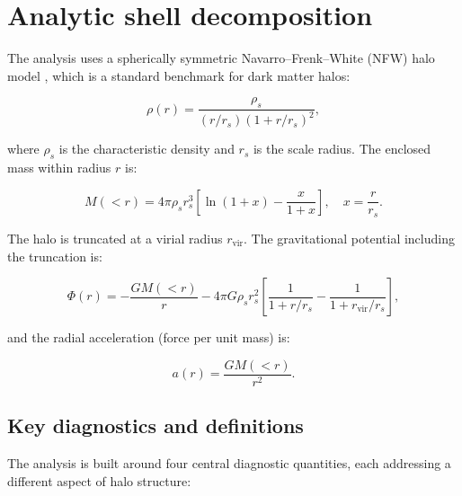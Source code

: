 \appendix
\chapter{Analytic shell decomposition}
\label{app:shells}

The analysis uses a spherically symmetric Navarro--Frenk--White (NFW) halo model \citep{navarro1996structure}, which is a standard benchmark for dark matter halos:

\begin{equation}
\rho(r) = \frac{\rho_s}{(r/r_s)(1 + r/r_s)^2},
\end{equation}

where $\rho_s$ is the characteristic density and $r_s$ is the scale radius. The enclosed mass within radius $r$ is:

\begin{equation}
M(<r) = 4\pi \rho_s r_s^3 \left[ \ln(1+x) - \frac{x}{1+x} \right], \quad x = \frac{r}{r_s}.
\end{equation}

The halo is truncated at a virial radius $r_{\mathrm{vir}}$. The gravitational potential including the truncation is:

\begin{equation}
\Phi(r) = -\frac{G M(<r)}{r} - 4\pi G \rho_s r_s^2 \left[ \frac{1}{1 + r/r_s} - \frac{1}{1 + r_{\mathrm{vir}}/r_s} \right],
\end{equation}

and the radial acceleration (force per unit mass) is:

\begin{equation}
a(r) = \frac{G M(<r)}{r^2}.
\end{equation}

\section{Key diagnostics and definitions}

The analysis is built around four central diagnostic quantities, each addressing a different aspect of halo structure:

